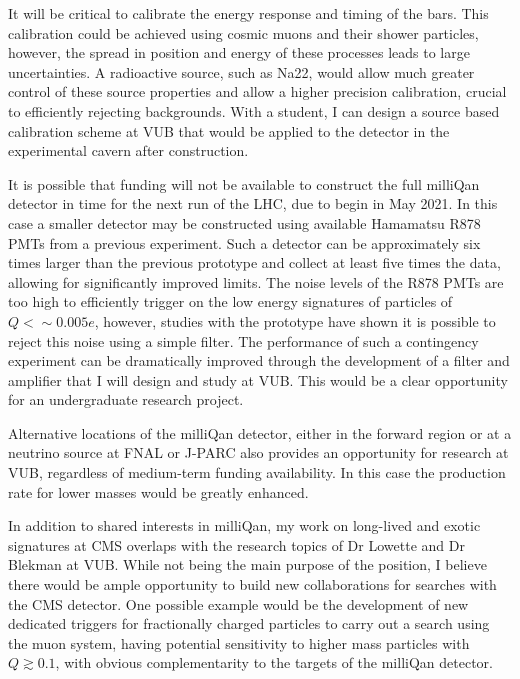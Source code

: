\documentclass[11pt]{article}
\theoremstyle{plain} \numberwithin{equation}{section}
\theoremstyle{definition}
\begin{document}
It will be critical to calibrate the energy response and timing of the bars. 
This calibration could be achieved using cosmic muons and their shower particles, 
however, the spread in position and energy of these processes
leads to large uncertainties. A radioactive source, such as Na22, would allow much greater control 
of these source properties and allow a higher precision calibration, crucial to efficiently 
rejecting backgrounds. With a student, I can design a source based calibration scheme 
at VUB that would be applied to the detector in the experimental cavern after construction.

It is possible that funding will not be available to construct the full milliQan detector in
time for the next run of the LHC, due to begin in May 2021. In this case a smaller 
detector may be constructed using available Hamamatsu R878 PMTs from a previous experiment. 
Such a detector can be approximately six times
larger than the previous prototype and collect at least five times the data, allowing for
significantly improved limits. The noise levels of the R878 PMTs are too high to efficiently 
trigger on the low energy signatures of particles of $Q < \sim 0.005 e$, however, studies with the prototype
have shown it is possible to reject this noise using a simple filter. The performance of
such a contingency experiment can be dramatically improved through the development of a
filter and amplifier that I will design and study at VUB. This would be a clear opportunity 
for an undergraduate research project.

Alternative locations of the milliQan detector, either in the forward region or at a neutrino source 
at FNAL or J-PARC also provides an opportunity for research at VUB, 
regardless of medium-term funding availability. In this case the production rate 
for lower masses would be greatly enhanced.

In addition to shared interests in milliQan, my work on long-lived and exotic signatures
at CMS overlaps with the research topics of Dr Lowette and Dr Blekman at VUB. 
While not being the main purpose of the position, I believe there would be ample opportunity
to build new collaborations for searches with the CMS detector. One possible example
would be the development of new dedicated triggers for fractionally 
charged particles to carry out a search using the muon system, having potential
sensitivity to higher mass particles with $Q \gtrsim 0.1$, with obvious complementarity 
to the targets of the milliQan detector.
\end{document}
